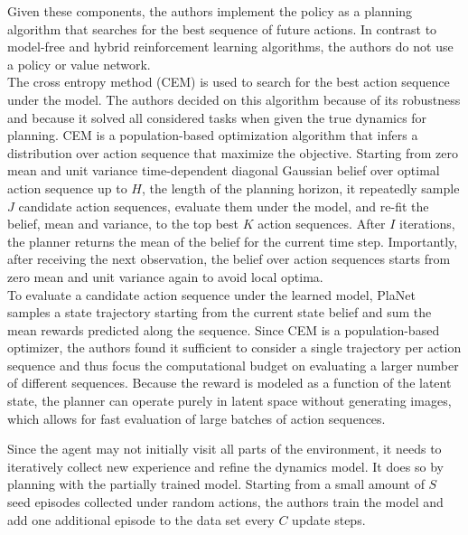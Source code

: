 Given these components, the authors implement the policy as a planning algorithm that searches for the best sequence of future actions. In contrast to model-free and hybrid reinforcement learning algorithms, the authors do not use a policy or value network. \\
The cross entropy method \cite{Algo.CEM} (CEM) is used to search for the best action sequence under the model. The authors decided on this algorithm because of its robustness and because it solved all considered tasks when given the true dynamics for planning. CEM is a population-based optimization algorithm that infers a distribution over action sequence that maximize the objective. Starting from zero mean and unit variance time-dependent diagonal Gaussian belief over optimal action sequence up to $H$, the length of the planning horizon, it repeatedly sample $J$ candidate action sequences, evaluate them under the model, and re-fit the belief, mean and variance, to the top best $K$ action sequences. After $I$ iterations, the planner returns the mean of the belief for the current time step. Importantly, after receiving the next observation, the belief over action sequences starts from zero mean and unit variance again to avoid local optima. \\

To evaluate a candidate action sequence under the learned model, PlaNet samples a state trajectory starting from the current state belief and sum the mean rewards predicted along the sequence. Since CEM is a population-based optimizer, the authors found it sufficient to consider a single trajectory per action sequence and thus focus the computational budget on evaluating a larger number of different sequences. Because the reward is modeled as a function of the latent state, the planner can operate purely in latent space without generating images, which allows for fast evaluation of large batches of action sequences.

Since the agent may not initially visit all parts of the environment, it needs to iteratively collect new experience and refine the dynamics model. It does so by planning with the partially trained model. Starting from a small amount of $S$ seed episodes collected under random actions, the authors train the model and add one additional episode to the data set every $C$ update steps.


